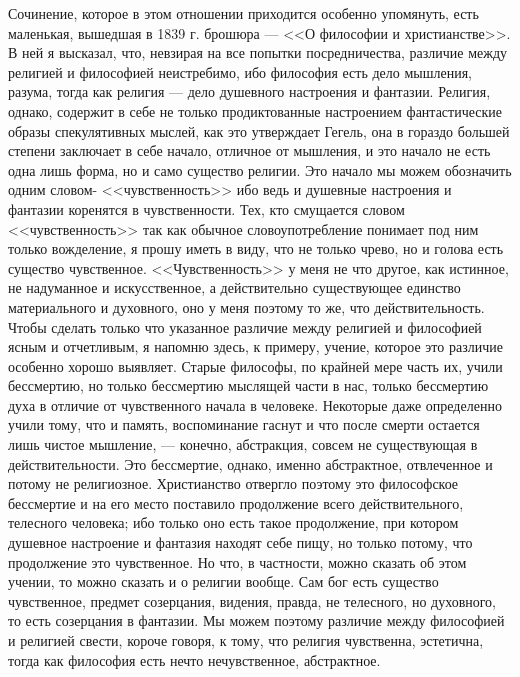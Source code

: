 \documentclass[12pt]{article}
\begin{document}
Сочинение, которое в этом отношении приходится особенно упомянуть, есть маленькая, вышедшая в 1839 г. брошюра --- <<О философии и христианстве>>. В ней я высказал, что, невзирая на все попытки посредничества, различие между религией и философией неистребимо, ибо философия есть дело мышления, разума, тогда как религия --- дело душевного настроения и фантазии. Религия, однако, содержит в себе не только продиктованные настроением фантастические образы спекулятивных мыслей, как это утверждает Гегель, она в гораздо большей степени заключает в себе начало, отличное от мышления, и это начало не есть одна лишь форма, но и само существо религии. Это начало мы можем обозначить одним словом- <<чувственность>>  ибо ведь и душевные настроения и фантазии коренятся в чувственности. Тех, кто смущается словом <<чувственность>>  так как обычное словоупотребление понимает под ним только вожделение, я прошу иметь в виду, что не только чрево, но и голова есть существо чувственное. <<Чувственность>> у меня не что другое, как истинное, не надуманное и искусственное, а действительно существующее единство материального и духовного, оно у меня поэтому то же, что действительность. Чтобы сделать только что указанное различие между религией и философией ясным и отчетливым, я напомню здесь, к примеру, учение, которое это различие особенно хорошо выявляет. Старые философы, по крайней мере часть их, учили бессмертию, но только бессмертию мыслящей части в нас, только бессмертию духа в отличие от чувственного начала в человеке. Некоторые даже определенно учили тому, что и память, воспоминание гаснут и что после смерти остается лишь чистое мышление, --- конечно, абстракция, совсем не существующая в действительности. Это бессмертие, однако, именно абстрактное, отвлеченное и потому не религиозное. Христианство отвергло поэтому это философское бессмертие и на его место поставило продолжение всего действительного, телесного человека; ибо только оно есть такое продолжение, при котором душевное настроение и фантазия находят себе пищу, но только потому, что продолжение это чувственное. Но что, в частности, можно сказать об этом учении, то можно сказать и о религии вообще. Сам бог есть существо чувственное, предмет созерцания, видения, правда, не телесного, но духовного, то есть созерцания в фантазии. Мы можем поэтому различие между философией и религией свести, короче говоря, к тому, что религия чувственна, эстетична, тогда как философия есть нечто нечувственное, абстрактное. 
\end{document}
